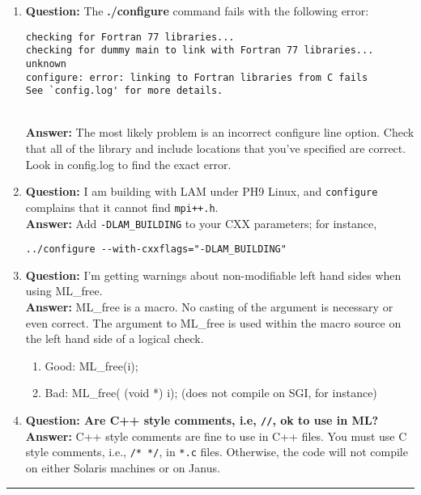 \documentclass[10pt,letter,relax]{SANDreport}
\newcommand{\HRule}{\noindent\rule{\linewidth}{1mm}}
\begin{document}
\begin{enumerate}
\item {\bf Question:} The {\bf ./configure} command
fails with the following error:
\begin{verbatim}
checking for Fortran 77 libraries...
checking for dummy main to link with Fortran 77 libraries... unknown
configure: error: linking to Fortran libraries from C fails
See `config.log' for more details.
\end{verbatim}~\\
{\bf Answer:} The most likely problem is an incorrect configure line option.
Check that all of the library and include locations that you've specified are
correct.
Look in config.log to find the exact error.
%
\item {\bf Question:} I am building with LAM under PH9 Linux, and
  {\tt configure} complains that it cannot find {\tt mpi++.h}.\\
{\bf Answer:} Add \verb!-DLAM_BUILDING! to your CXX parameters; for
instance,
\begin{verbatim}
../configure --with-cxxflags="-DLAM_BUILDING"
\end{verbatim}
%
\item {\bf Question:} I'm getting warnings about non-modifiable left hand sides
when using ML\_free.\\
{\bf Answer:} ML\_free is a macro.  No casting of the argument is necessary or
even correct.
The argument to ML\_free is used within the
macro source on the left hand side of a logical check.
  \begin{enumerate}
    \item[ ] Good: ML\_free(i);
    \item[ ] Bad: ML\_free( (void *) i); (does not compile on SGI, for instance)
  \end{enumerate}
%
%
\item {\bf Question: Are C++ style comments, i.e, \verb!//!, ok to use in
ML?}\\
{\bf Answer:} C++ style comments are fine to use in C++ files.
You must use C style comments, i.e., \verb!/* */!, in \verb!*.c! files.
Otherwise, the code will not compile on either Solaris machines or on Janus.
\end{enumerate}


\clearpage
\newpage

\vspace*{3cm}
\HRule
\end{document}
